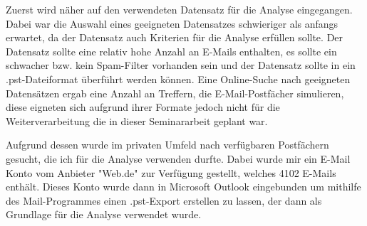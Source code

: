 Zuerst wird näher auf den verwendeten Datensatz für die Analyse eingegangen. Dabei war die Auswahl eines geeigneten Datensatzes schwieriger als anfangs erwartet, da der Datensatz auch Kriterien für die Analyse erfüllen sollte. Der Datensatz sollte eine relativ hohe Anzahl an E-Mails enthalten, es sollte ein schwacher bzw. kein Spam-Filter vorhanden sein und der Datensatz sollte in ein .pst-Dateiformat überführt werden können. Eine Online-Suche nach geeigneten Datensätzen ergab eine Anzahl an Treffern, die E-Mail-Postfächer simulieren, diese eigneten sich aufgrund ihrer Formate jedoch nicht für die Weiterverarbeitung die in dieser Seminararbeit geplant war.

Aufgrund dessen wurde im privaten Umfeld nach verfügbaren Postfächern gesucht, die ich für die Analyse verwenden durfte. Dabei wurde mir ein E-Mail Konto vom Anbieter "Web.de" zur Verfügung gestellt, welches 4102 E-Mails enthält. Dieses Konto wurde dann in Microsoft Outlook eingebunden um mithilfe des Mail-Programmes einen .pst-Export erstellen zu lassen, der dann als Grundlage für die Analyse verwendet wurde.